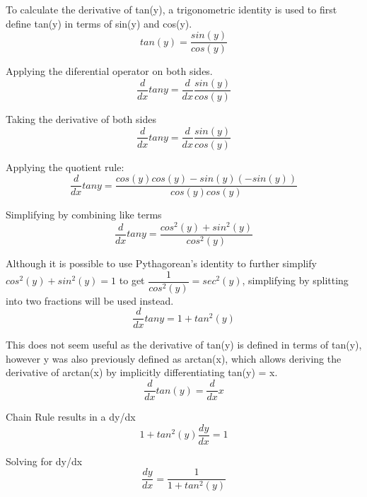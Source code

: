 \documentclass[12pt, titlepage]{article}
\begin{document}
To calculate the derivative of tan(y), a trigonometric identity is used to first define tan(y) in terms of sin(y) and cos(y).
\begin{equation*}
 tan(y) = \frac{sin(y)}{cos(y)}
\end{equation*}

Applying the diferential operator on both sides.
\begin{equation*}
  \frac{d}{dx} tany = \frac{d}{dx} \frac{sin(y)}{cos(y)}
\end{equation*}

Taking the derivative of both sides
\begin{equation*}
  \frac{d}{dx} tany = \frac{d}{dx} \frac{sin(y)}{cos(y)}
\end{equation*}

Applying the quotient rule:
\begin{equation*}
  \frac{d}{dx} tany = \frac{cos(y)cos(y) - sin(y)(-sin(y))}{cos(y)cos(y)}
\end{equation*}

Simplifying by combining like terms
\begin{equation*}
  \frac{d}{dx} tany = \frac{cos^{2}(y) + sin^{2}(y)}{cos^{2}(y)}
\end{equation*}

Although it is possible to use Pythagorean's identity to further simplify \(cos^{2}(y) + sin^{2}(y) = 1\) to get \(\dfrac{1}{cos^{2}(y)} = sec^{2}(y)\), simplifying by splitting into two fractions will be used instead. 
\begin{equation*}
  \frac{d}{dx} tany = 1 + tan^{2}(y)
\end{equation*}

This does not seem useful as the derivative of tan(y) is defined in terms of tan(y), however y was also previously defined as arctan(x), which allows deriving the derivative of arctan(x) by implicitly differentiating tan(y) = x.
\begin{equation*}
 \frac{d}{dx} tan(y) = \frac{d}{dx} x
\end{equation*}

Chain Rule results in a dy/dx
\begin{equation*}
 1 + tan^{2}(y) \frac{dy}{dx}  = 1
\end{equation*}

Solving for dy/dx
\begin{equation*}
 \frac{dy}{dx}  = \frac{1}{1 + tan^{2}(y)}
\end{equation*}
\end{document}
